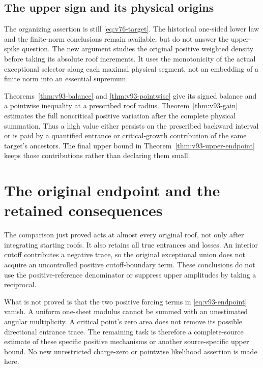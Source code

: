 \documentclass[11pt,reqno]{amsart}
\numberwithin{equation}{section}
\theoremstyle{definition}\newtheorem{definition}[theorem]{Definition}
\theoremstyle{remark}\newtheorem{remark}[theorem]{Remark}
\theoremstyle{definition}\newtheorem{inputstatement}[theorem]{Input statement}
\begin{document}


\subsection{The upper sign and its physical origins}
The organizing assertion is still \eqref{eq:v76-target}. The historical
one-sided lower law and the finite-norm conclusions remain available,
but do not answer the upper-spike question. The new argument studies
the original positive weighted density before taking its absolute
roof increments. It uses the monotonicity of the actual exceptional
selector along each maximal physical segment, not an embedding of a
finite norm into an essential supremum.

Theorems~\ref{thm:v93-balance} and \ref{thm:v93-pointwise} give its
signed balance and a pointwise inequality at a prescribed roof radius.
Theorem~\ref{thm:v93-gain} estimates the full noncritical positive
variation after the complete physical summation. Thus a high value
either persists on the prescribed backward interval or is paid by a
quantified entrance or critical-growth contribution of the same target's
ancestors. The final upper bound in Theorem~\ref{thm:v93-upper-endpoint}
keeps those contributions rather than declaring them small.






\section{The original endpoint and the retained consequences}
The comparison just proved acts at almost every original roof, not
only after integrating starting roofs. It also retains all true
entrances and losses. An interior cutoff contributes a negative trace,
so the original exceptional union does not acquire an uncontrolled
positive cutoff-boundary term. These conclusions do not use the
positive-reference denominator or suppress upper amplitudes by taking
a reciprocal.

What is not proved is that the two positive forcing terms in
\eqref{eq:v93-endpoint} vanish. A uniform one-sheet modulus cannot be
summed with an unestimated angular multiplicity. A critical point's
zero area does not remove its possible directional entrance trace.
The remaining task is therefore a complete-source estimate of these
specific positive mechanisms or another source-specific upper bound.
No new unrestricted charge-zero or pointwise likelihood assertion is
made here.
\end{document}
